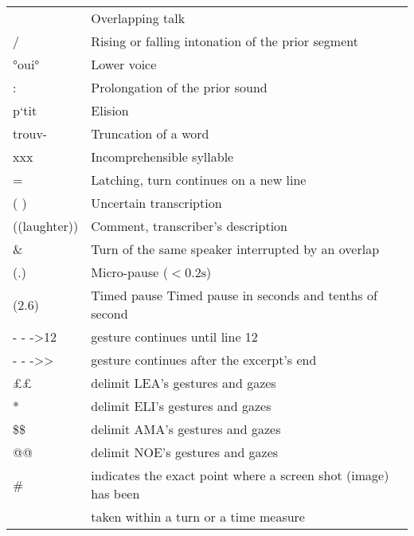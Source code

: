 \documentclass[output=paper]{langscibook}
\begin{document}
\begin{tabular}{@{}>{\ttfamily}ll@{}}
[oui]    &  Overlapping talk                                       \\
/   \    &  Rising or falling intonation of the prior segment    \\
°oui°    &  Lower voice                                            \\
:        &  Prolongation of the prior sound                       \\
p`tit    &  Elision                                                \\
trouv-   &  Truncation of a word                                   \\
xxx      &  Incomprehensible syllable                              \\
=        &  Latching, turn continues on a new line                 \\
( )    &  Uncertain transcription                      \\
((laughter))  &  Comment, transcriber's description          \\
\&       &  Turn of the same speaker interrupted by an overlap     \\
(.)      &  Micro-pause ($<0.2\text{s}$)                                 \\
(2.6)    &  Timed pause Timed pause in seconds and tenths of second\\
*- - ->12    & gesture continues until line 12   \\
*- - ->{}>   & gesture continues after the excerpt's end   \\
££        &  delimit LEA’s gestures and gazes                     \\
**        &  delimit ELI’s gestures and gazes                  \\
\$\$      &  delimit AMA’s gestures and gazes                   \\
@@        &  delimit NOE’s gestures and gazes                   \\
\#       & indicates the exact point where a screen shot (image) has been \\ 
         &  taken within a turn or a time measure \\
\end{tabular}

{\sloppy\printbibliography[heading=subbibliography,notkeyword=this]}
\end{document}
